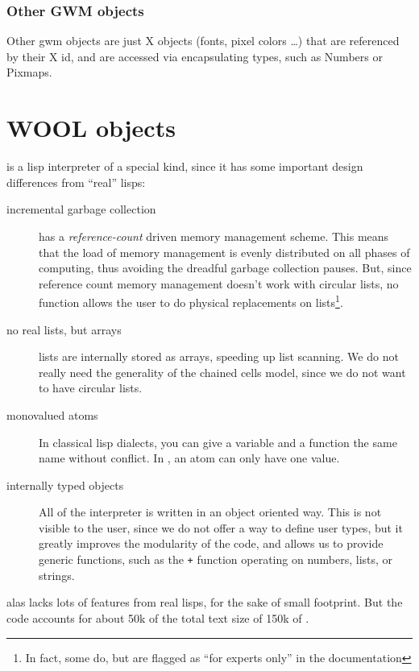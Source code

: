 \subsubsection{Other GWM objects}

Other gwm objects are just X objects (fonts, pixel colors \ldots) that are
referenced by their X id, and are accessed via encapsulating
{\WOOL} types, such as Numbers or Pixmaps.

\section{WOOL objects}

{\WOOL} is a lisp interpreter of a special kind, since it has some important
design differences from ``real'' lisps:

\begin{description}

\item[incremental garbage collection] {\WOOL} has a {\sl reference-count\/}
driven memory management scheme. This means that the load of memory
management is evenly distributed on all phases of computing, thus avoiding
the dreadful garbage collection pauses. But, since reference count memory
management doesn't work with circular lists, no {\WOOL} function allows the
user to do physical replacements on lists\footnote{In fact, some do, but are
flagged as ``for experts only'' in the documentation}. 

\item[no real lists, but arrays] {\WOOL} lists are internally stored as
arrays, speeding up list scanning. We do not really need the
generality of the chained cells model, since we do not want to have circular
lists.

\item[monovalued atoms] In classical lisp dialects, you can give a variable
and a function the same name without conflict. In {\WOOL}, an atom can only
have one value.

\item[internally typed objects] All of the {\WOOL} interpreter is written in
an object oriented way. This is not visible to the user, since we do not
offer a way to define user types, but it greatly improves the modularity of
the code, and allows us to provide generic functions, such as the \verb"+"
function operating on numbers, lists, or strings.

\end{description}

{\WOOL} alas lacks lots of features from real lisps, for the sake of small
footprint. But the {\WOOL} code accounts for about 50k of the total text size of
150k of {\GWM}.

